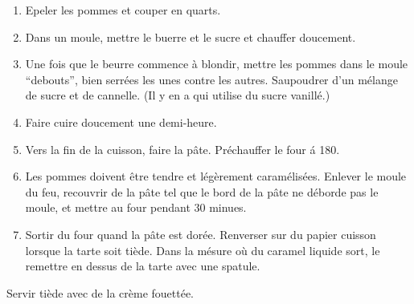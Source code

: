 \begin{recipe}
  \begin{enumerate}

  \item Epeler les pommes et couper en quarts.

  \item Dans un moule, mettre le buerre et le sucre et chauffer doucement.

  \item Une fois que le beurre commence \`a blondir, mettre les pommes
    dans le moule ``debouts'', bien serr\'ees les unes contre les
    autres.  Saupoudrer d'un m\'elange de sucre et de cannelle.  (Il y
    en a qui utilise du sucre vanill\'e.)

  \item Faire cuire doucement une demi-heure.

  \item Vers la fin de la cuisson, faire la p\^ate.  Pr\'echauffer le
    four \'a 180\degreeC.

  \item Les pommes doivent \^etre tendre et l\'eg\`erement
    caram\'elis\'ees.  Enlever le moule du feu, recouvrir de la p\^ate
    tel que le bord de la p\^ate ne d\'eborde pas le moule, et mettre
    au four pendant 30 minues.

  \item Sortir du four quand la p\^ate est dor\'ee.  Renverser sur du
    papier cuisson lorsque la tarte soit ti\`ede.  Dans la m\'esure o\`u
    du caramel liquide sort, le remettre en dessus de la tarte avec
    une spatule.

  \end{enumerate}

  Servir ti\`ede avec de la cr\`eme fouett\'ee.
\end{recipe}




